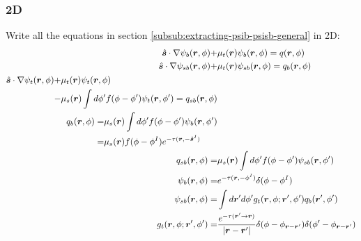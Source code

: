 \documentclass [10pt,letterpaper]{article}
\renewcommand{\vec}{\vectorsym}
\newcommand{\unitvec}[1]{\hat{\vec{#1}}}
\newcommand{\grad}{\nabla}
\begin{document}
\subsubsection{2D}
\label{subsub:extracting-psib-psisb-2d}
Write all the equations in section \ref{subsub:extracting-psib-psisb-general} in 2D:
\begin{subequations} \label{eq:def-psi-2ndtime-psisb-psit-2d-qb-2ndtime-qsb-2d}
	\begin{align}
		\unitvec{s} \cdot \grad
		\psi_b(\vec{r},\phi)
		+&
		\mu_t(\vec{r})
		\psi_b(\vec{r},\phi)
		=
		q(\vec{r},\phi) 
		\label{eq:def-psib-2d-2ndtime}
		\\ 
		\unitvec{s} \cdot \grad
		\psi_{sb}(\vec{r},\phi)
		+&
		\mu_t(\vec{r})
		\psi_{sb}(\vec{r},\phi)
		=
		q_b(\vec{r},\phi) 
		\label{eq:def-psisb-2d}
		\\
		\begin{split}
			\unitvec{s} \cdot \grad
			\psi_t(\vec{r},\phi)
			+&
			\mu_t(\vec{r})
			\psi_t(\vec{r},\phi)
			\\
			-&
			\mu_s(\vec{r})
			\int d\phi^\prime
			f(\phi - \phi^\prime)
			\psi_t(\vec{r},\phi^\prime)
			=
			q_{sb}(\vec{r},\phi) 
		\end{split}
		\label{eq:def-psit-2d} 
		\\
		\begin{split}
			q_b(\vec{r},\phi)
			=&
			\mu_s(\vec{r})
			\int d\phi^\prime
			f(\phi - \phi^\prime)
			\psi_b(\vec{r},\phi^\prime)
			\\
			=&
			\mu_s(\vec{r})
			f(\phi-\phi^I)
			e^{-\tau(\vec{r},-\unitvec{s}^I)} 
		\end{split}
		\label{eq:result-qb-2d-2ndtime}
		\\ 
		q_{sb}(\vec{r},\phi)
		=&
		\mu_s(\vec{r})
		\int d\phi^\prime
		f(\phi - \phi^\prime)
		\psi_{sb}(\vec{r},\phi^\prime)
		\label{eq:def-qsb-2d}
		\\
		\psi_b(\vec{r},\phi)
		=&
		e^{-\tau(\vec{r},-\phi^I)}
		\delta(\phi-\phi^I)
		\label{eq:result-psib-2d-2ndtime} 
		\\
		\psi_{sb}(\vec{r},\phi)
		=&
		\int d\vec{r}^\prime d\phi^\prime
		g_t(\vec{r},\phi;\vec{r}^\prime,\phi^\prime) 
		q_b(\vec{r}^\prime,\phi^\prime) 
		\label{eq:der-psisb-2d} 
		\\
		g_t(\vec{r},\phi;\vec{r}^\prime,\phi^\prime)
		=&
		\frac
		{e^{-\tau(\vec{r}^\prime\to\vec{r})}}
		{\lvert \vec{r}-\vec{r}^\prime \rvert}
		\delta(\phi-\phi_{\vec{r}-\vec{r}^\prime})
		\delta(\phi^\prime-\phi_{\vec{r}-\vec{r}^\prime})
		\label{eq:exp-gft-2d-2ndtime} 
	\end{align}
\end{subequations}
\end{document}

